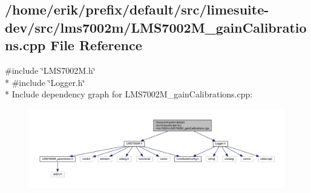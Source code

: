 \subsection{/home/erik/prefix/default/src/limesuite-\/dev/src/lms7002m/\+L\+M\+S7002\+M\+\_\+gain\+Calibrations.cpp File Reference}
\label{LMS7002M__gainCalibrations_8cpp}
{\ttfamily \#include \char`\"{}L\+M\+S7002\+M.\+h\char`\"{}}\\*
{\ttfamily \#include \char`\"{}Logger.\+h\char`\"{}}\\*
Include dependency graph for L\+M\+S7002\+M\+\_\+gain\+Calibrations.\+cpp\+:
\nopagebreak
\begin{figure}[H]
\begin{center}
\leavevmode
\includegraphics[width=350pt]{db/d05/LMS7002M__gainCalibrations_8cpp__incl}
\end{center}
\end{figure}
